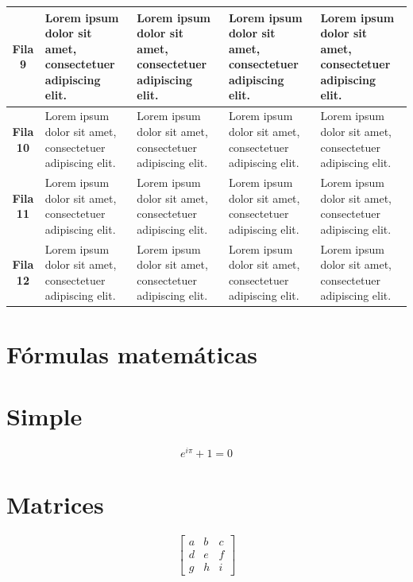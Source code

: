 \begin{longtable}{p{2cm}|p{3cm}|p{3cm}|p{3cm}|p{3cm}|}
    \multicolumn{1}{|c|}{\textbf{Fila 9}} & Lorem ipsum dolor sit amet, consectetuer adipiscing elit. & Lorem ipsum dolor sit amet, consectetuer adipiscing elit. & Lorem ipsum dolor sit amet, consectetuer adipiscing elit. & Lorem ipsum dolor sit amet, consectetuer adipiscing elit. \\ \hline    
    \multicolumn{1}{|c|}{\textbf{Fila 10}} & Lorem ipsum dolor sit amet, consectetuer adipiscing elit. & Lorem ipsum dolor sit amet, consectetuer adipiscing elit. & Lorem ipsum dolor sit amet, consectetuer adipiscing elit. & Lorem ipsum dolor sit amet, consectetuer adipiscing elit. \\ \hline    
    \multicolumn{1}{|c|}{\textbf{Fila 11}} & Lorem ipsum dolor sit amet, consectetuer adipiscing elit. & Lorem ipsum dolor sit amet, consectetuer adipiscing elit. & Lorem ipsum dolor sit amet, consectetuer adipiscing elit. & Lorem ipsum dolor sit amet, consectetuer adipiscing elit. \\ \hline    
    \multicolumn{1}{|c|}{\textbf{Fila 12}} & Lorem ipsum dolor sit amet, consectetuer adipiscing elit. & Lorem ipsum dolor sit amet, consectetuer adipiscing elit. & Lorem ipsum dolor sit amet, consectetuer adipiscing elit. & Lorem ipsum dolor sit amet, consectetuer adipiscing elit. \\ \hline    
\end{longtable}

\section{Fórmulas matemáticas}

\section*{Simple}
\begin{equation}
    e^{i\pi} + 1 = 0
    \label{eq:euler}
\end{equation}

\section*{Matrices}
\begin{equation}
    \left[
    \begin{matrix}
     a & b & c \\
     d & e & f \\
     g & h & i
    \end{matrix}
    \right]
    \label{eq:matriz}
\end{equation}

